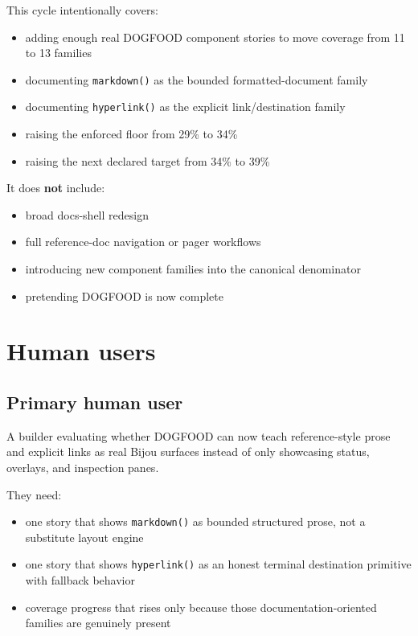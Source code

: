 This cycle intentionally covers:

\begin{itemize}
\tightlist
\item
  adding enough real DOGFOOD component stories to move coverage from 11 to 13 families
\item
  documenting \texttt{m\allowbreak{}a\allowbreak{}r\allowbreak{}k\allowbreak{}d\allowbreak{}o\allowbreak{}w\allowbreak{}n\allowbreak{}(\allowbreak{})} as the bounded formatted-document family
\item
  documenting \texttt{h\allowbreak{}y\allowbreak{}p\allowbreak{}e\allowbreak{}r\allowbreak{}l\allowbreak{}i\allowbreak{}n\allowbreak{}k\allowbreak{}(\allowbreak{})} as the explicit link/destination family
\item
  raising the enforced floor from 29\% to 34\%
\item
  raising the next declared target from 34\% to 39\%
\end{itemize}

It does \textbf{not} include:

\begin{itemize}
\tightlist
\item
  broad docs-shell redesign
\item
  full reference-doc navigation or pager workflows
\item
  introducing new component families into the canonical denominator
\item
  pretending DOGFOOD is now complete
\end{itemize}

\section{Human users}\label{record-070-human-users}

\subsection{Primary human user}\label{record-070-primary-human-user}

A builder evaluating whether DOGFOOD can now teach reference-style prose and explicit links as real Bijou surfaces instead of only showcasing status, overlays, and inspection panes.

They need:

\begin{itemize}
\tightlist
\item
  one story that shows \texttt{m\allowbreak{}a\allowbreak{}r\allowbreak{}k\allowbreak{}d\allowbreak{}o\allowbreak{}w\allowbreak{}n\allowbreak{}(\allowbreak{})} as bounded structured prose, not a substitute layout engine
\item
  one story that shows \texttt{h\allowbreak{}y\allowbreak{}p\allowbreak{}e\allowbreak{}r\allowbreak{}l\allowbreak{}i\allowbreak{}n\allowbreak{}k\allowbreak{}(\allowbreak{})} as an honest terminal destination primitive with fallback behavior
\item
  coverage progress that rises only because those documentation-oriented families are genuinely present
\end{itemize}

